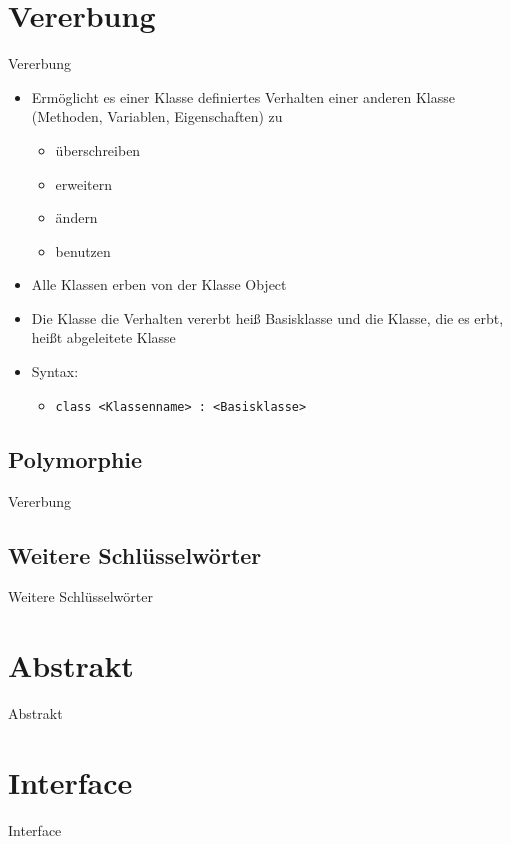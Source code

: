 \section{Vererbung}
\begin{frame}{Vererbung}
	\begin{itemize}
		\item Ermöglicht es einer Klasse definiertes Verhalten einer anderen Klasse (Methoden, Variablen, Eigenschaften) zu
		\begin{itemize}
			\item überschreiben
			\item erweitern
			\item ändern
			\item benutzen
		\end{itemize}
		\item Alle Klassen erben von der Klasse \alert{Object}
		\item Die Klasse die Verhalten vererbt heiß \alert{Basisklasse} und die Klasse, die es erbt, heißt \alert{abgeleitete Klasse}
		\item Syntax:
		\begin{itemize}
			\item \texttt{class \alert{<Klassenname>} : \alert{<Basisklasse>}}
		\end{itemize}
	\end{itemize}
	
\end{frame}

\subsection{Polymorphie}
\begin{frame}{Vererbung}
\end{frame}

\subsection{Weitere Schlüsselwörter}
\begin{frame}{Weitere Schlüsselwörter}
\end{frame}

\section{Abstrakt}
\begin{frame}{Abstrakt}

\end{frame}

\section{Interface}
\begin{frame}{Interface}

\end{frame}


